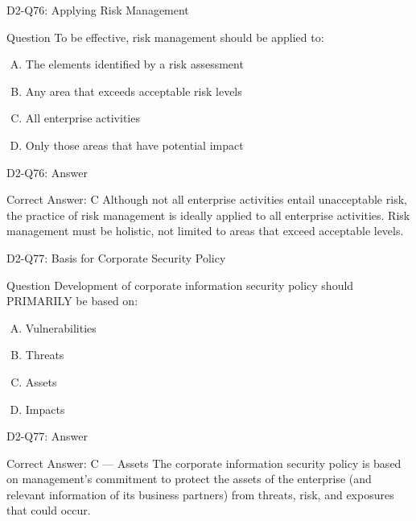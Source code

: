 \documentclass{beamer}
\begin{document}
	\begin{frame}{D2-Q76: Applying Risk Management}
		\begin{block}{Question}
			To be effective, risk management should be applied to:
		\end{block}
		\begin{enumerate}[(A)]
			\item The elements identified by a risk assessment
			\item Any area that exceeds acceptable risk levels
			\item All enterprise activities
			\item Only those areas that have potential impact
		\end{enumerate}
	\end{frame}
	\begin{frame}{D2-Q76: Answer}
		\begin{block}{Correct Answer: C}
			Although not all enterprise activities entail unacceptable risk, the practice of risk management is ideally applied to all enterprise activities. Risk management must be holistic, not limited to areas that exceed acceptable levels.
		\end{block}
	\end{frame}
	
	\begin{frame}{D2-Q77: Basis for Corporate Security Policy}
		\begin{block}{Question}
			Development of corporate information security policy should PRIMARILY be based on:
		\end{block}
		\begin{enumerate}[(A)]
			\item Vulnerabilities
			\item Threats
			\item Assets
			\item Impacts
		\end{enumerate}
	\end{frame}
	\begin{frame}{D2-Q77: Answer}
		\begin{block}{Correct Answer: C --- Assets}
			The corporate information security policy is based on management's commitment to protect the assets of the enterprise (and relevant information of its business partners) from threats, risk, and exposures that could occur.
		\end{block}
	\end{frame}
	
\end{document}
